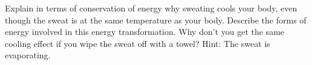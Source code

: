 Explain in
terms of conservation of energy why sweating cools your
body, even though the sweat is at the same temperature as
your body. Describe the forms of energy involved in this
energy transformation.
Why don't you get the same cooling effect if you
wipe the sweat off with a towel? Hint: 
The sweat is evaporating.
